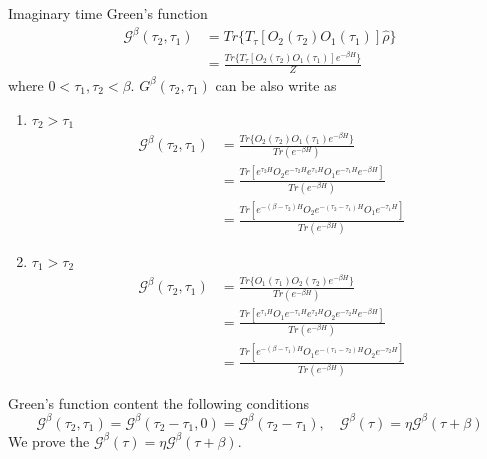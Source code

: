\documentclass[a4paper,11pt]{article}
\begin{document}
Imaginary time Green's function
\begin{equation*}
  \begin{split}
     \mathcal{G}^\beta(\tau_2,\tau_1)&=Tr\{T_\tau[O_2(\tau_2)O_1(\tau_1)]\hat{\rho}\}\\
       &=\frac{Tr\{T_\tau[O_2(\tau_2)O_1(\tau_1)]e^{-\beta H}\}}{Z}
  \end{split}
\end{equation*}
where $0<\tau_1,\tau_2<\beta$. $G^\beta(\tau_2,\tau_1)$ can be also write as
\begin{enumerate}
  \item $\tau_2>\tau_1$
  \begin{equation*}
    \begin{split}
       \mathcal{G}^\beta(\tau_2,\tau_1)&=\frac{Tr\{O_2(\tau_2)O_1(\tau_1)e^{-\beta H}\}}{Tr(e^{-\beta H})}\\
         &=\frac{Tr[e^{\tau_2H}O_2e^{-\tau_2H}e^{\tau_1H}O_1e^{-\tau_1H}e^{-\beta H}]}{Tr(e^{-\beta H})}\\
         &=\frac{Tr[e^{-(\beta-\tau_2)H}O_2e^{-(\tau_2-\tau_1)H}O_1e^{-\tau_1H}]}{Tr(e^{-\beta H})}
    \end{split}
  \end{equation*}
  \item $\tau_1>\tau_2$
  \begin{equation*}
    \begin{split}
       \mathcal{G}^\beta(\tau_2,\tau_1)&=\frac{Tr\{O_1(\tau_1)O_2(\tau_2)e^{-\beta H}\}}{Tr(e^{-\beta H})}\\
         &=\frac{Tr[e^{\tau_1H}O_1e^{-\tau_1H}e^{\tau_2H}O_2e^{-\tau_2H}e^{-\beta H}]}{Tr(e^{-\beta H})}\\
         &=\frac{Tr[e^{-(\beta-\tau_1)H}O_1e^{-(\tau_1-\tau_2)H}O_2e^{-\tau_2H}]}{Tr(e^{-\beta H})}
    \end{split}
  \end{equation*}
\end{enumerate}
Green's function content the following conditions
\begin{equation*}
  \mathcal{G}^\beta(\tau_2,\tau_1)=\mathcal{G}^\beta(\tau_2-\tau_1,0)=\mathcal{G}^\beta(\tau_2-\tau_1),\quad \mathcal{G}^\beta(\tau)=\eta \mathcal{G}^\beta(\tau+\beta)
\end{equation*}
We prove the $\mathcal{G}^\beta(\tau)=\eta \mathcal{G}^\beta(\tau+\beta)$.
\end{document}
